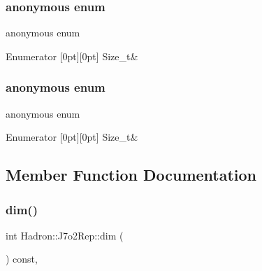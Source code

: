 \subsubsection{\texorpdfstring{anonymous enum}{anonymous enum}}
{\footnotesize\ttfamily anonymous enum}

\begin{DoxyEnumFields}{Enumerator}
[0pt][0pt]{}\mbox{\label{structHadron_1_1J7o2Rep_a4424f431ea7377c107b7eb46d52b240cade6da0350f71a39a43a346c50b6b5cb4}} 
Size\+\_\+t&\\
\hline

\end{DoxyEnumFields}
\mbox{\label{structHadron_1_1J7o2Rep_a4424f431ea7377c107b7eb46d52b240c}} 
\subsubsection{\texorpdfstring{anonymous enum}{anonymous enum}}
{\footnotesize\ttfamily anonymous enum}

\begin{DoxyEnumFields}{Enumerator}
[0pt][0pt]{}\mbox{\label{structHadron_1_1J7o2Rep_a4424f431ea7377c107b7eb46d52b240cade6da0350f71a39a43a346c50b6b5cb4}} 
Size\+\_\+t&\\
\hline

\end{DoxyEnumFields}


\subsection{Member Function Documentation}
\mbox{\label{structHadron_1_1J7o2Rep_a0134ed51bb5cad59f0a552c5bc472765}} 
\subsubsection{\texorpdfstring{dim()}{dim()}\hspace{0.1cm}{\footnotesize\ttfamily [1/3]}}
{\footnotesize\ttfamily int Hadron\+::\+J7o2\+Rep\+::dim (\begin{DoxyParamCaption}{ }\end{DoxyParamCaption}) const\hspace{0.3cm}{\ttfamily [inline]}, {\ttfamily [virtual]}}



